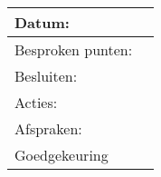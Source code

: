 \begin{tabularx}{\textwidth}{| l | X |}
  \hline
  Datum: & \\
  \hline
  Besproken punten: & \\
  \hline
  Besluiten: & \\
  Acties: & \\
  Afspraken: & \\
  \hline
  Goedgekeuring & \\
  \hline
\end{tabularx}
